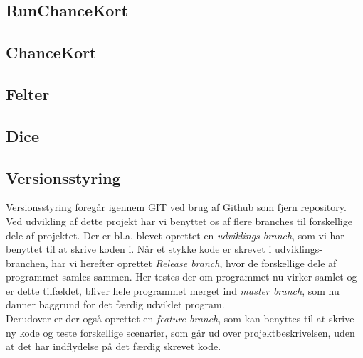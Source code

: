 \subsection{RunChanceKort}
\subsection{ChanceKort}
\subsection{Felter}
\subsection{Dice}




 

\subsection{Versionsstyring}
Versionsstyring foregår igennem GIT ved brug af Github som fjern repository. Ved udvikling af dette projekt har vi benyttet os af flere branches til forskellige dele af projektet. Der er bl.a. blevet oprettet en \emph{udviklings branch}, som vi har benyttet til at skrive koden i. Når et stykke kode er skrevet i udviklings-branchen, har vi herefter oprettet \emph{Release branch}, hvor de forskellige dele af programmet samles sammen. Her testes der om programmet nu virker samlet og er dette tilfældet, bliver hele programmet merget ind \emph{master branch}, som nu danner baggrund for det færdig udviklet program.
\\Derudover er der også oprettet en \emph{feature branch}, som kan benyttes til at skrive ny kode og teste forskellige scenarier, som går ud over projektbeskrivelsen, uden at det har indflydelse på det færdig skrevet kode.

